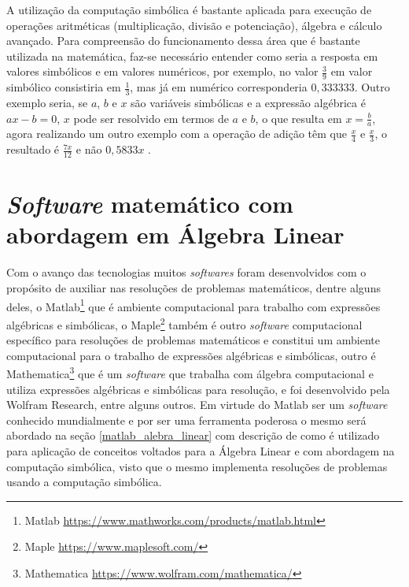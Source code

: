 A utilização da computação simbólica é bastante aplicada para execução de operações aritméticas (multiplicação, divisão e potenciação), álgebra e cálculo avançado. Para compreensão do funcionamento dessa área que é bastante utilizada na matemática, faz-se necessário entender como seria a resposta em valores simbólicos e em valores numéricos, por exemplo, no valor $\frac{3}{9}$ em valor simbólico consistiria em $\frac{1}{3}$, mas já em numérico corresponderia $0,333333$. Outro exemplo seria, se $a$, $b$ e $x$ são variáveis simbólicas e a expressão algébrica é $ax-b = 0$, $x$ pode ser resolvido em termos de $a$ e $b$, o que resulta em $x = \frac{b}{a}$, agora realizando um outro exemplo com a operação de adição têm que $\frac{x}{4}$ e $\frac{x}{3}$, o resultado é $\frac{7x}{12}$ e não $0,5833x$ \cite{2012:Amos}. 

\section{\textit{Software} matemático com abordagem em Álgebra Linear}
\noindent Com o avanço das tecnologias muitos \textit{softwares} foram desenvolvidos com o propósito de auxiliar nas resoluções de problemas matemáticos, dentre alguns deles, o  Matlab\footnote[2]{Matlab \url{https://www.mathworks.com/products/matlab.html}} que é ambiente computacional para trabalho com expressões algébricas e simbólicas, o Maple\footnote[3]{Maple \url{https://www.maplesoft.com/}} também é outro \textit{software} computacional específico para resoluções de problemas matemáticos e constitui um ambiente computacional para o trabalho de expressões algébricas e simbólicas, outro é Mathematica\footnote[4]{Mathematica \url{https://www.wolfram.com/mathematica/}} que é um \textit{software} que trabalha com álgebra computacional e utiliza expressões algébricas e simbólicas para resolução, e foi desenvolvido pela Wolfram Research, entre alguns outros. Em virtude do Matlab ser um \textit{software} conhecido mundialmente e por ser uma ferramenta poderosa o mesmo será abordado na seção \ref{matlab_alebra_linear} com descrição de como é utilizado para aplicação de conceitos voltados para a Álgebra Linear e com abordagem na computação simbólica, visto que o mesmo implementa resoluções de problemas usando a computação simbólica.

